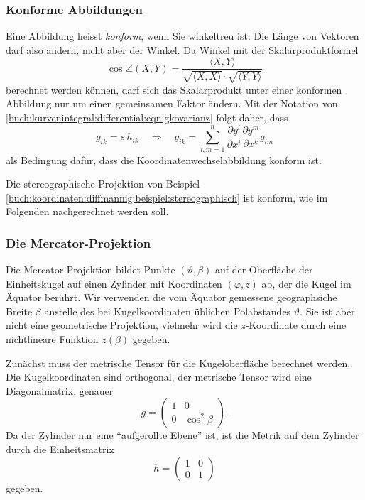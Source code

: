 %
%
\subsubsection{Konforme Abbildungen}
Eine Abbildung heisst {\em konform}, wenn Sie winkeltreu ist.
Die Länge von Vektoren darf also ändern, nicht aber der Winkel.
Da Winkel mit der Skalarproduktformel
\[
\cos \angle(X,Y)
=
\frac{
\langle X,Y \rangle
}{
\!\sqrt{\langle X, X\rangle}\cdot\!\sqrt{\langle Y,Y\rangle}
}
\]
berechnet werden können, darf sich das Skalarprodukt unter einer
konformen Abbildung nur um einen gemeinsamen Faktor ändern.
Mit der Notation von
\eqref{buch:kurvenintegral:differential:eqn:gkovarianz}
folgt daher, dass
\[
g_{ik} = s\,h_{ik}
\quad\Rightarrow\quad
g_{ik}
=
\sum_{l,m=1}^n
\frac{\partial y^l}{\partial x^i}
\frac{\partial y^m}{\partial x^k}
g_{lm}
\]
als Bedingung dafür, dass die Koordinatenwechselabbildung
konform ist.

\begin{beispiel}
Die stereographische Projektion von Beispiel 
\ref{buch:koordinaten:diffmannig:beispiel:stereographisch}
ist konform, wie im Folgenden nachgerechnet werden soll.
\end{beispiel}

%
%
\subsubsection{Die Mercator-Projektion}
Die Mercator-Projektion bildet Punkte $(\vartheta,\beta)$ auf
%
der Oberfläche der Einheitskugel auf einen Zylinder mit Koordinaten
$(\varphi,z)$ ab, der die Kugel im Äquator berührt.
%
Wir verwenden die vom Äquator gemessene geographsiche Breite $\beta$
%
anstelle des bei Kugelkoordinaten üblichen Polabstandes $\vartheta$.
Sie ist aber nicht eine geometrische Projektion, vielmehr wird die
$z$-Koordinate durch eine nichtlineare Funktion $z(\beta)$
gegeben.

Zunächst muss der metrische Tensor für die Kugeloberfläche
berechnet werden.
Die Kugelkoordinaten sind orthogonal, der metrische Tensor wird
eine Diagonalmatrix, genauer
\[
g
=
\begin{pmatrix}
 1 & 0           \\
 0 & \cos^2\beta
\end{pmatrix}.
\]
Da der Zylinder nur eine ``aufgerollte Ebene'' ist, ist die Metrik
auf dem Zylinder durch die Einheitsmatrix
\[
h = \begin{pmatrix} 1&0\\0&1\end{pmatrix}
\]
gegeben.

